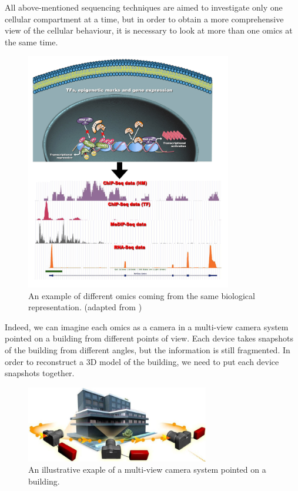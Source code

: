 All above-mentioned sequencing techniques are aimed to investigate only one cellular compartment at a time, but in order to obtain a more comprehensive view of the cellular behaviour, it is necessary to look at more than one omics at the same time.

\begin{figure}[H]
\centering
\includegraphics[width=9cm, keepaspectratio]{img/intro/multiomicsex.png}
\caption[Multi-Omics Representation]{An example of different omics coming from the same biological representation. (adapted from \cite{Angelini2014c})}
\label{fig:omics}
\end{figure}

Indeed, we can imagine each omics as a camera in a multi-view camera system pointed on a building from different points of view.
Each device takes snapshots of the building from different angles, but the information is still fragmented.
In order to reconstruct a 3D model of the building, we need to put each device snapshots together.

\begin{figure}[h]
\centering
\includegraphics[width=8cm, keepaspectratio]{img/intro/cameras.png}
\caption[Integration cameras]{An illustrative exaple of a multi-view camera system pointed on a building.}
\label{fig:cameras}
\end{figure}

